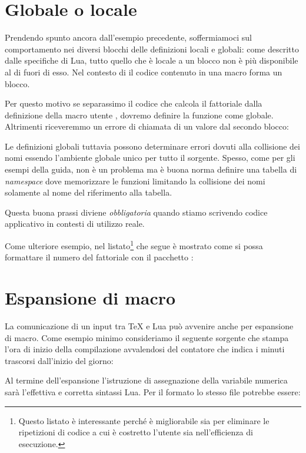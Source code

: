 \section{Globale o locale}

Prendendo spunto ancora dall'esempio precedente, soffermiamoci sul comportamento
nei diversi blocchi  delle definizioni locali e globali: come
descritto dalle specifiche di Lua, tutto quello che è locale a un blocco non è
più disponibile al di fuori di esso. Nel contesto di \LuaTeX{} il codice
contenuto in una macro  forma un blocco.

Per questo motivo se separassimo il codice che calcola il fattoriale dalla
definizione della macro utente , dovremo definire la funzione
come globale. Altrimenti riceveremmo un errore di chiamata di un valore
 dal secondo blocco:

Le definizioni globali tuttavia possono determinare errori dovuti alla
collisione dei nomi essendo l'ambiente globale unico per tutto il sorgente.
Spesso, come per gli esempi della guida, non è un problema ma è buona norma
definire una tabella di \emph{namespace} dove memorizzare le funzioni limitando
la collisione dei nomi solamente al nome del riferimento alla tabella.

Questa buona prassi diviene \emph{obbligatoria} quando stiamo scrivendo codice
applicativo in contesti di utilizzo reale.

Come ulteriore esempio, nel listato\footnote{Questo listato è interessante
perché è migliorabile sia per eliminare le ripetizioni di codice a cui è
costretto l'utente sia nell'efficienza di esecuzione.} che segue è mostrato come
si possa formattare il numero del fattoriale con il pacchetto
: 


\section{Espansione di macro}

La comunicazione di un input tra \TeX{} e Lua può avvenire anche per espansione
di macro. Come esempio minimo consideriamo il seguente sorgente \LuaTeX{} che
stampa l'ora di inizio della compilazione avvalendosi del contatore 
che indica i minuti trascorsi dall'inizio del giorno:

Al termine dell'espansione l'istruzione di assegnazione della variabile numerica
 sarà l'effettiva e corretta sintassi Lua. Per il formato \LuaLaTeX{}
lo stesso file potrebbe essere:

